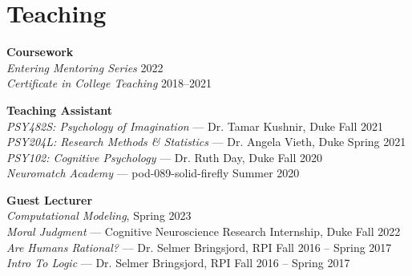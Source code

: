 \section{Teaching}
\textbf{Coursework} \\
\emph{Entering Mentoring Series} \hfill 2022 \\
\emph{Certificate in College Teaching} \hfill 2018--2021

\textbf{Teaching Assistant} \\
\emph{PSY482S: Psychology of Imagination} --- Dr. Tamar Kushnir, Duke \hfill Fall 2021 \\
\emph{PSY204L: Research Methods \& Statistics} --- Dr. Angela Vieth, Duke \hfill Spring 2021 \\
\emph{PSY102: Cognitive Psychology} --- Dr. Ruth Day, Duke  \hfill Fall 2020 \\
\emph{Neuromatch Academy} --- pod-089-solid-firefly \hfill Summer 2020

\textbf{Guest Lecturer} \\
\emph{Computational Modeling},  \hfill Spring 2023 \\
\emph{Moral Judgment} --- Cognitive Neuroscience Research Internship, Duke \hfill Fall 2022 \\
\emph{Are Humans Rational?} --- Dr. Selmer Bringsjord, RPI \hfill Fall 2016 -- Spring 2017 \\
\emph{Intro To Logic} --- Dr. Selmer Bringsjord, RPI \hfill Fall 2016 -- Spring 2017
